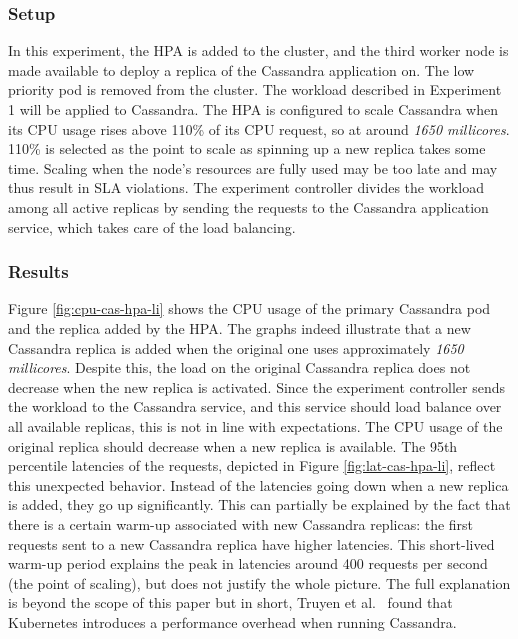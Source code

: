 \subsubsection{Setup}
In this experiment, the HPA is added to the cluster, and the third worker node is made available to deploy a replica of the Cassandra application on. The low priority pod is removed from the cluster. The workload described in Experiment 1 will be applied to Cassandra. The HPA is configured to scale Cassandra when its CPU usage rises above 110\% of its CPU request, so at around \textit{1650 millicores}. 110\% is selected as the point to scale as spinning up a new replica takes some time. Scaling when the node's resources are fully used may be too late and may thus result in SLA violations. The experiment controller divides the workload among all active replicas by sending the requests to the Cassandra application service, which takes care of the load balancing. 

\subsubsection{Results}
Figure \ref{fig:cpu-cas-hpa-li} shows the CPU usage of the primary Cassandra pod and the replica added by the HPA. The graphs indeed illustrate that a new Cassandra replica is added when the original one uses approximately \textit{1650 millicores}. Despite this, the load on the original Cassandra replica does not decrease when the new replica is activated. Since the experiment controller sends the workload to the Cassandra service, and this service should load balance over all available replicas, this is not in line with expectations. The CPU usage of the original replica should decrease when a new replica is available. The 95th percentile latencies of the requests, depicted in Figure \ref{fig:lat-cas-hpa-li}, reflect this unexpected behavior. Instead of the latencies going down when a new replica is added, they go up significantly. This can partially be explained by the fact that there is a certain warm-up associated with new Cassandra replicas: the first requests sent to a new Cassandra replica have higher latencies. This short-lived warm-up period explains the peak in latencies around 400 requests per second (the point of scaling), but does not justify the whole picture. The full explanation is beyond the scope of this paper but in short, Truyen et al.~\citep{TruyenEddy2019Pooc} found that Kubernetes introduces a performance overhead when running Cassandra. %

